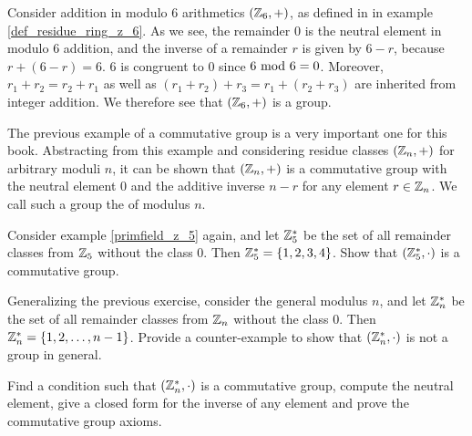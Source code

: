 \begin{example} Consider addition in modulo $6$ arithmetics $(\mathbb{Z}_6,+)$, as defined in in example \ref{def_residue_ring_z_6}. As we see, the remainder $0$ is the neutral element in modulo $6$ addition, and the inverse of a remainder $r$ is given by $6-r$, because $r+(6-r)=6$. $6$ is congruent to $0$ since $6 \text{ mod } 6=0$. Moreover, $r_1+r_2 = r_2 + r_1$ as well as $(r_1+r_2)+r_3=r_1+(r_2+r_3)$ are inherited from integer addition. We therefore see that $(\mathbb{Z}_6,+)$ is a group.
\end{example}
The previous example of a commutative group is a very important one for this book. Abstracting from this example and considering residue classes $(\mathbb{Z}_n,+)$ for arbitrary moduli $n$, it can be shown that $(\mathbb{Z}_n,+)$ is a commutative group with the neutral element $0$ and the additive inverse $n-r$ for any element $r\in\mathbb{Z}_n$. We call such a group the  of modulus $n$.
\begin{exercise}\label{fstar} Consider example \ref{primfield_z_5} again, and let $\mathbb{Z}_5^*$ be the set of all remainder classes from $\mathbb{Z}_5$ without the class $0$. Then $\mathbb{Z}_5^*=\{1,2,3,4\}$. Show that $(\mathbb{Z}_5^*,\cdot)$ is a commutative group.
\end{exercise}
\begin{exercise}\label{ex:Zn*} Generalizing the previous exercise, consider the general modulus $n$, and let $\mathbb{Z}_n^*$ be the set of all remainder classes from $\mathbb{Z}_n$ without the class $0$. Then $\mathbb{Z}_n^*=\{1,2,\ldots,n-1\}$. Provide a counter-example to show that $(\mathbb{Z}^*_n,\cdot)$ is not a group in general.

Find a condition such that $(\mathbb{Z}^*_n,\cdot)$ is a commutative group, compute the neutral element, give a closed form for the inverse of any element and prove the commutative group axioms.
\end{exercise}
